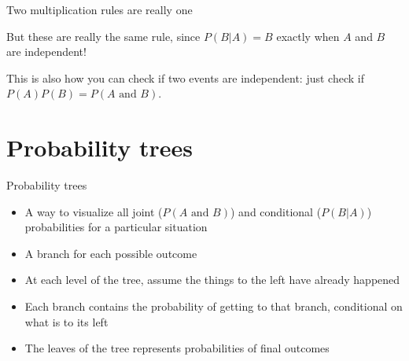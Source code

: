 \documentclass{beamer}\usepackage[]{graphicx}\usepackage[]{color}
\makeatletter
\newcommand{\hlnum}[1]{\textcolor[rgb]{0.686,0.059,0.569}{#1}}%
\newcommand{\hlopt}[1]{\textcolor[rgb]{0,0,0}{#1}}%
\newcommand{\hlstd}[1]{\textcolor[rgb]{0.345,0.345,0.345}{#1}}%
\newcommand{\hlkwd}[1]{\textcolor[rgb]{0.737,0.353,0.396}{\textbf{#1}}}%
\newenvironment{kframe}{%
 \def\at@end@of@kframe{}%
 \ifinner\ifhmode%
  \def\at@end@of@kframe{\end{minipage}}%
  \begin{minipage}{\columnwidth}%
 \fi\fi%
 \def\FrameCommand##1{\hskip\@totalleftmargin \hskip-\fboxsep
 \colorbox{shadecolor}{##1}\hskip-\fboxsep
     \hskip-\linewidth \hskip-\@totalleftmargin \hskip\columnwidth}%
 \MakeFramed {\advance\hsize-\width
   \@totalleftmargin\z@ \linewidth\hsize
   \@setminipage}}%
 {\par\unskip\endMakeFramed%
 \at@end@of@kframe}
\newenvironment{knitrout}{}{} %
\makeatother
\begin{document}
\begin{darkframes}
\begin{frame}{Two multiplication rules are really one}
      \vspace{0.5in}\pause

      But these are really the same rule, since $P(B|A)=B$ exactly when $A$ and $B$ are independent! 

      \vspace{0.3in}\pause
      
      This is also how you can check if two events are independent: just check if $P(A)P(B)=P(\text{$A$ and $B$})$.
    \end{frame}


    \section{Probability trees}

    \begin{frame}{Probability trees}
      \begin{itemize}
        \item A way to visualize all joint ($P(\text{$A$ and $B$})$) and conditional ($P(B|A)$) probabilities for a particular situation
        \item A branch for each possible outcome
        \item At each level of the tree, assume the things to the left have already happened
        \item Each branch contains the probability of getting to that branch, conditional on what is to its left
        \item The leaves of the tree represents probabilities of final outcomes
      \end{itemize}
    \end{frame}


\end{darkframes}
\end{document}
